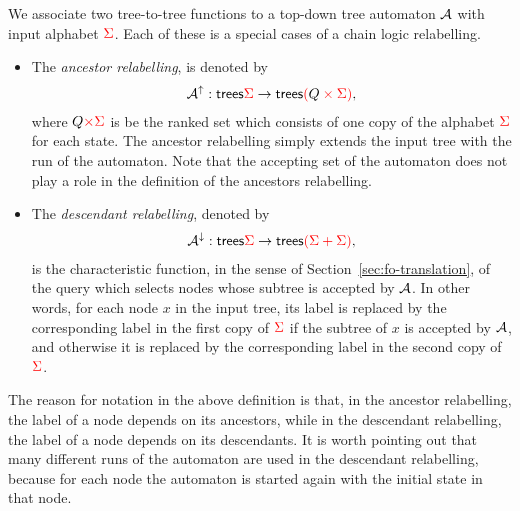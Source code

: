 \begin{definition}
    \label{def:tree-relabellings-for-a-top-down-tree-automaton}
    We associate two tree-to-tree functions to a top-down tree automaton ${\mathcal A}$ with input alphabet ${\color{red}{\Sigma}}$. Each  of these is a special cases of a chain logic relabelling. 
\begin{itemize}
    \item The \emph{ancestor relabelling}, is denoted by 
     \begin{align*}
        {\mathcal A}^\uparrow: \mathsf {trees} {\color{red}{\Sigma}} \to \mathsf {trees} {\color{red}{({\color{black}{Q}} \times {\color{red}{\Sigma}})}},
        \end{align*}
        where  $Q {\color{red}{\times \Sigma}}$ is be the ranked set which consists of one copy of the alphabet ${\color{red}{\Sigma}}$ for each state. The ancestor relabelling simply extends the input tree with the run of the automaton. Note that the accepting set  of the automaton does not play a role in the definition of the ancestors relabelling.
    \item The \emph{descendant relabelling}, denoted by
    \begin{align*}
        {\mathcal A}^\downarrow : \mathsf {trees} {\color{red}{\Sigma}} \to \mathsf {trees}{\color{red}{({\color{red}{\Sigma}}+ {\color{red}{\Sigma}})}},
        \end{align*}
    is the characteristic function, in the sense of Section~\ref{sec:fo-translation}, of the query which selects nodes whose subtree is accepted by ${\mathcal A}$. In other words, for each node $x$ in the input tree, its label is replaced by the corresponding label in the first copy of ${\color{red}{\Sigma}}$ if the subtree of $x$ is accepted by ${\mathcal A}$, and otherwise it is replaced by the corresponding label in the second copy of ${\color{red}{\Sigma}}$. 
\end{itemize}
\end{definition}

The reason for  notation in the above definition is that, in the ancestor relabelling, the label of a node depends on its ancestors, while in the descendant  relabelling, the label of a node depends on its descendants. It is worth pointing out that many different runs of the automaton are used in the descendant relabelling, because for each node the automaton is started again with the initial state in that node. 

